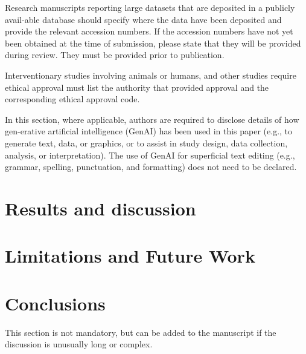 \documentclass[journal,article,submit,pdftex,moreauthors]{Definitions/mdpi}
\begin{document}
Research manuscripts reporting large datasets that are deposited in a publicly avail-able database should specify where the data have been deposited and provide the relevant accession numbers. If the accession numbers have not yet been obtained at the time of submission, please state that they will be provided during review. They must be provided prior to publication.

Interventionary studies involving animals or humans, and other studies require ethical approval must list the authority that provided approval and the corresponding ethical approval code.

In this section, where applicable, authors are required to disclose details of how gen-erative artificial intelligence (GenAI) has been used in this paper (e.g., to generate text, data, or graphics, or to assist in study design, data collection, analysis, or interpretation). The use of GenAI for superficial text editing (e.g., grammar, spelling, punctuation, and formatting) does not need to be declared.

\section{Results and discussion}

\section{Limitations and Future Work}


\section{Conclusions}

This section is not mandatory, but can be added to the manuscript if the discussion is unusually long or complex.

\vspace{6pt} 


\end{document}
